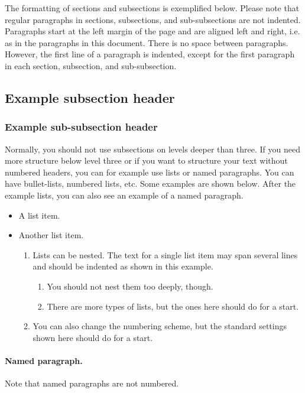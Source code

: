 \documentclass[12pt,a4paper]{article}
\begin{document}
The formatting of sections and subsections is exemplified below. Please note that regular paragraphs in sections, subsections, and sub-subsections are not indented. Paragraphs start at the left margin of the page and are aligned left and right, i.e. as in the paragraphs in this document. There is no space between paragraphs. However, the first line of a paragraph is indented, except for the first paragraph in each section, subsection, and sub-subsection.


\subsection{Example subsection header}

\subsubsection{Example sub-subsection header}
Normally, you should not use subsections on levels deeper than three. If you need more structure below level three or if you want to structure your text without numbered headers, you can for example use lists or named paragraphs. You can have bullet-lists, numbered lists, etc. Some examples are shown below. After the example lists, you can also see an example of a named paragraph. 
\begin{itemize}
    \item A list item.
    \item Another list item.
    \begin{enumerate}
        \item Lists can be nested. The text for a single list item may span several lines and should be indented as shown in this example.
        \begin{enumerate}
            \item You should not nest them too deeply, though.
            \item There are more types of lists, but the ones here should do for a start.
        \end{enumerate}
        \item You can also change the numbering scheme, but the standard settings shown here should do for a start. 
    \end{enumerate}
\end{itemize}

\paragraph{Named paragraph.}
Note that named paragraphs are not numbered.
\end{document}
